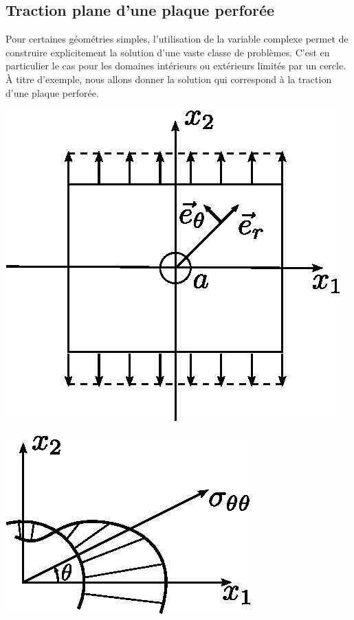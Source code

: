 \subsection{Traction plane d'une plaque perforée}\label{ssec:Ch08-2.2}
Pour certaines géométries simples, l'utilisation de la variable complexe permet de construire explicitement la solution d'une vaste classe de problèmes. 
C'est en particulier le cas pour les domaines intérieurs ou extérieurs limités par un cercle. 
À titre d'exemple, nous allons donner la solution qui correspond à la traction d'une plaque perforée. 
\begin{multicols}{2}
    \begin{center}
        \includegraphics{../images/T1_Ch08-03a}
    \end{center}
    \columnbreak
    \begin{center}
        \includegraphics{../images/T1_Ch08-03b}
    \end{center}
\end{multicols}

